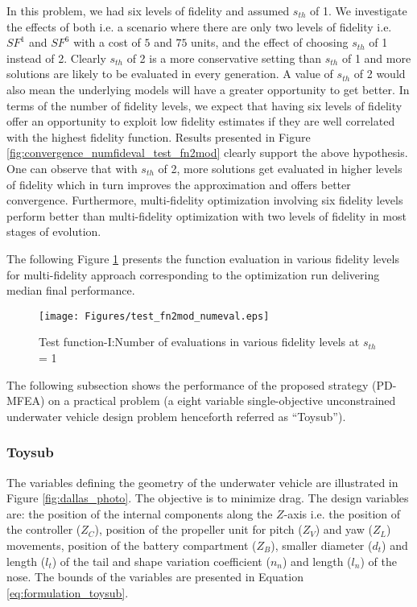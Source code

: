 In this problem, we had six levels of fidelity and assumed $s_{th}$ of 1. We investigate the effects of both i.e. a scenario where there are only two levels of fidelity i.e. $SF^1$ and $SF^6$ with a cost of $5$ and $75$ units, and the effect of choosing $s_{th}$ of 1 instead of 2.  Clearly $s_{th}$ of 2 is a more conservative setting than $s_{th}$ of 1 and more solutions are likely to be evaluated in every generation. A value of $s_{th}$ of 2 would also mean the underlying models will have a greater opportunity to get better.  In terms of the number of fidelity levels, we  expect that having six levels of fidelity offer an opportunity to exploit low fidelity estimates if they are well correlated with the highest fidelity function. Results presented in Figure \ref{fig:convergence_numfideval_test_fn2mod} clearly support the above hypothesis. One can observe that with $s_{th}$ of 2, more solutions get evaluated in higher levels of fidelity which in turn improves the approximation and offers better convergence. Furthermore, multi-fidelity optimization involving six fidelity levels perform better than multi-fidelity optimization with two levels of fidelity in most stages of evolution.

The following Figure \ref{fig:test_fn2mod_Numfideval_obj1_1sigma} presents the function evaluation in various fidelity levels for multi-fidelity approach corresponding to the optimization run delivering median final performance.  

\begin{figure}[ht]
	\centering
	\texttt{[image: Figures/test\_fn2mod\_numeval.eps]}
	\caption{Test function-I:Number of evaluations in various fidelity levels at $s_{th}$ = 1}
	\label{fig:test_fn2mod_Numfideval_obj1_1sigma}
\end{figure}

The following subsection shows the performance of the proposed strategy (PD-MFEA) on a practical problem (a eight variable single-objective unconstrained underwater vehicle design problem henceforth referred as ``Toysub'').

\subsubsection{Toysub}
The variables defining the geometry of the underwater vehicle are illustrated in Figure \ref{fig:dallas_photo}. The objective is to minimize drag. The design variables are: the position of the internal components along the $Z$-axis i.e. the position of the controller ($Z_C$), position of the propeller unit for pitch ($Z_V$) and yaw ($Z_L$) movements, position of the battery compartment ($Z_B$), smaller diameter ($d_t$) and length ($l_t$) of the tail and shape variation coefficient ($n_n$) and length ($l_n$) of the nose. The bounds of the variables are presented in Equation \ref{eq:formulation_toysub}.

